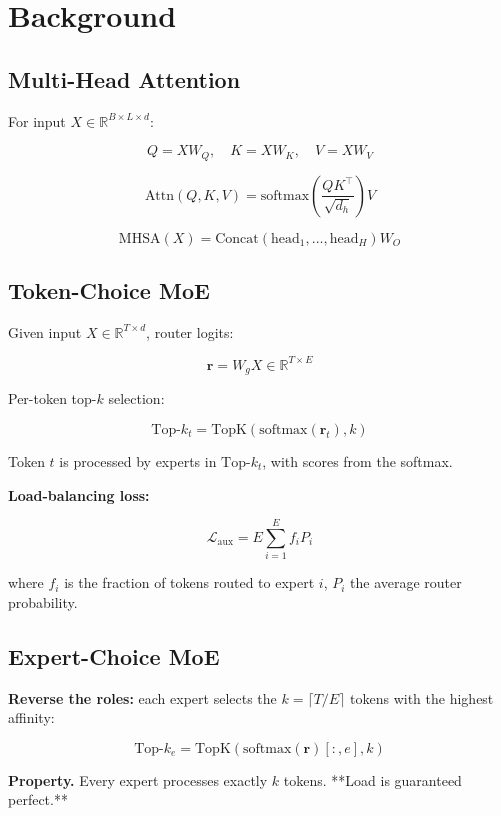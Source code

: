 \section{Background}

\subsection{Multi-Head Attention}

For input $X \in \mathbb{R}^{B \times L \times d}$:

\[
Q = X W_Q, \quad K = X W_K, \quad V = X W_V
\tag{3.1}
\]

\[
\text{Attn}(Q, K, V) = \text{softmax}\!\left(\frac{Q K^\top}{\sqrt{d_h}}\right) V
\tag{3.2}
\]

\[
\text{MHSA}(X) = \text{Concat}(\text{head}_1, \dots, \text{head}_H) W_O
\tag{3.3}
\]

\subsection{Token-Choice MoE}

Given input $X \in \mathbb{R}^{T \times d}$, router logits:

\[
\mathbf{r} = W_g X \in \mathbb{R}^{T \times E}
\tag{3.4}
\]

Per-token top-$k$ selection:

\[
\text{Top-}k_t = \text{TopK}(\text{softmax}(\mathbf{r}_t), k)
\tag{3.5}
\]

Token $t$ is processed by experts in $\text{Top-}k_t$, with scores from the 
softmax.

\textbf{Load-balancing loss:}

\[
\mathcal{L}_\text{aux} = E \sum_{i=1}^{E} f_i P_i
\tag{3.6}
\]

where $f_i$ is the fraction of tokens routed to expert $i$, $P_i$ the 
average router probability.

\subsection{Expert-Choice MoE}

\textbf{Reverse the roles:} each expert selects the $k = \lceil T / E \rceil$ 
tokens with the highest affinity:

\[
\text{Top-}k_e = \text{TopK}\!\left(\text{softmax}(\mathbf{r})[:, e], k\right)
\tag{3.7}
\]

\textbf{Property.} Every expert processes exactly $k$ tokens. **Load is 
guaranteed perfect.**

